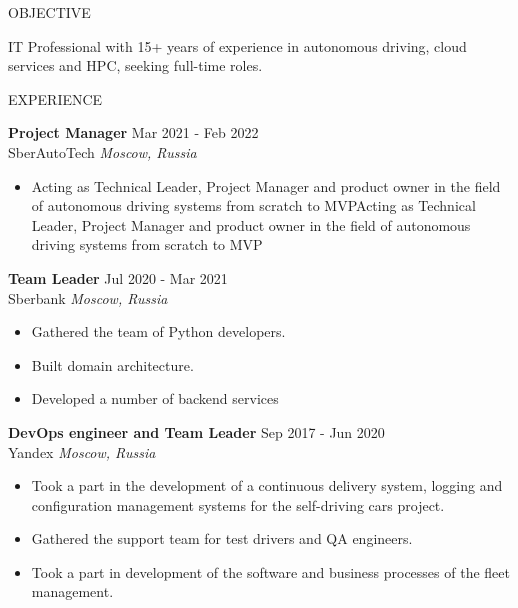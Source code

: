 \documentclass{resume} %
\begin{document}

\begin{rSection}{OBJECTIVE}

{IT Professional with 15+ years of experience in autonomous driving, cloud services and HPC, seeking full-time roles.}

\end{rSection}



\begin{rSection}{EXPERIENCE}

\textbf{Project Manager} \hfill Mar 2021 - Feb 2022\\
SberAutoTech \hfill \textit{Moscow, Russia}
\begin{itemize}
   \itemsep -3pt {}
   \item Acting as Technical Leader, Project Manager and product owner in the field of autonomous driving systems from scratch to MVPActing as Technical Leader, Project Manager and product owner in the field of autonomous driving systems from scratch to MVP

\end{itemize}

\textbf{Team Leader} \hfill Jul 2020 - Mar 2021\\
Sberbank \hfill \textit{Moscow, Russia}
\begin{itemize}
   \itemsep -3pt {}
   \item Gathered the team of Python developers.
   \item Built domain architecture.
   \item Developed a number of backend services
\end{itemize}

\textbf{DevOps engineer and Team Leader} \hfill Sep 2017 - Jun 2020\\
Yandex \hfill \textit{Moscow, Russia}
\begin{itemize}
   \itemsep -3pt {}
   \item Took a part in the development of a continuous delivery system, logging and configuration management systems for the self-driving cars project.
   \item Gathered the support team for test drivers and QA engineers.
   \item Took a part in development of the software and business processes of the fleet management.
\end{itemize}


\end{rSection}
\end{document}
